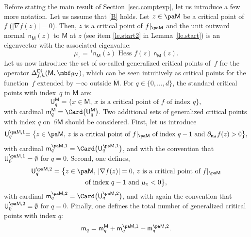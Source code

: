 Before stating the main result of Section~\ref{sec.comptevp}, let us
introduce a few more notation. Let us assume that \hbox{\ref{B}} holds. Let $z\in \pa \mathsf M$ be a critical point of~$f$ (\ie $\vert \nabla f(z)\vert =0$). Then, $z$ is a critical point of $f|_{\pa \mathsf M}$ and
the unit outward normal~$\mathsf n_{\mathsf M}(z)$ to $ \mathsf M$
at $z$ (see item \eqref{le.start2} in Lemma~\ref{le.start}) is an eigenvector with
the associated eigenvalue:
\begin{equation}\label{eq.lambdad}
\mu_z = \,^t \mathsf n_{\mathsf M}(z) \text{ Hess } f(z) \, \mathsf n_{\mathsf M}(z).
\end{equation}
Let us now introduce the set of so-called generalized critical
points of~$f$ for the operator $\Delta_{f,h}^{\mathsf{Di}}(\mathsf
M,\mbf g_{\mathsf M})$, which can be seen intuitively as critical
points for the function~$f$ extended by $-\infty$ outside
$\overline{\mathsf M}$.
For $q\in \{0,\ldots,d\}$, the standard critical points with index~$q$
in $\mathsf M$ are:
\[
\mathsf U_q^{\mathsf M}= \big \{x \in \mathsf M, \, x \text{ is a
critical point of } f \text{ of index } q \big \},
\]
with cardinal $\mathsf m_{q}^{\mathsf M}=\Card\bigl(\mathsf
U_q^{\mathsf M}\bigr)$. Two additional sets of generalized critical
points with index $q$ on~$\partial \mathsf M$ should be considered. First, let us introduce
\begin{equation}\label{eq.PSGENE}
\mathsf U_q^{\pa \mathsf M,1}\hspace*{-1mm}= \big \{z \in \pa \mathsf M, \, z \text{ is a critical point of } f|_{\pa \mathsf M} \text{ of index } q-1 \text{ and } \partial_{\mathsf n_{ \mathsf M}}f(z)>0\big \},
\end{equation}
with cardinal $
\mathsf m_q^{\pa \mathsf M,1}=\Card\bigl (\mathsf U_q^{\pa
\mathsf M,1} \bigr)$, and
with the convention that $
\mathsf U_0^{\pa \mathsf M,1}=\emptyset$
for $q=0$. Second, one defines,
\begin{multline}\label{eq.PS-nouveau}
\mathsf U_q^{\pa \mathsf M,2}=\big \{z \in \pa \mathsf M, \, \vert
\nabla f(z)\vert =0, \, z \text{ is a critical point of } f|_{\pa
\mathsf M}\\
\text{of index } q-1\text{ and }\mu_z <0\big \},
\end{multline}
with cardinal $\mathsf m_q^{\pa \mathsf M,2}=\Card\bigl(\mathsf U_q^{\pa \mathsf M,2}\bigr)$, and with again the convention
that $
\mathsf U_0^{\pa \mathsf M,2}=\emptyset$ for $q=0$.
Finally, one defines the total number
of generalized critical points with index $q$:
\begin{equation}\label{numb-generalize}
\mathsf m_q=\mathsf m_q^{ \mathsf M}+\mathsf m_q^{\pa \mathsf M,1}+\mathsf m_q^{\pa \mathsf M,2}.
\end{equation}

